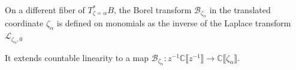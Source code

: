 \documentclass[10pt,a4paper]{amsart}
\newcommand{\maps}{\colon}
\newcommand{\C}{\mathbb{C}}
\newcommand{\laplace}{\mathcal{L}}
\newcommand{\borel}{\mathcal{B}}
\numberwithin{equation}{section}
\begin{document}
On a different fiber of $T_{\zeta=\alpha}^*B$, the Borel transform $\borel_{\zeta_\alpha}$ in the translated coordinate $\zeta_\alpha$ is defined on monomials as the inverse of the Laplace transform $\laplace_{\zeta_\alpha,0}$
\begin{center}
\end{center}
It extends countable linearity to a map $\borel_{\zeta_\alpha} \maps z^{-1} \C \big\llbracket z^{-1} \big\rrbracket \to \C \llbracket \zeta_\alpha \rrbracket$.
%
\end{document}
